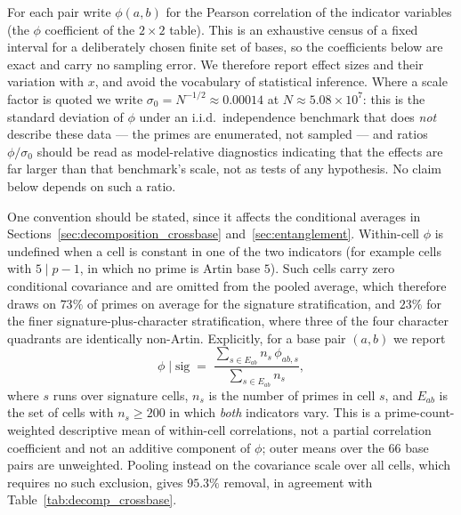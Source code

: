 \documentclass[11pt,reqno]{amsart}
\theoremstyle{plain}
\theoremstyle{definition}
\begin{document}
For each pair write $\phi(a,b)$ for the Pearson correlation of the indicator
variables (the $\phi$ coefficient of the $2\times2$ table). This is an exhaustive census of a fixed
interval for a deliberately chosen finite set of bases, so the coefficients
below are exact and carry no sampling error. We therefore report effect sizes
and their variation with $x$, and avoid the vocabulary of statistical
inference. Where a scale factor is quoted we write
$\sigma_0 = N^{-1/2} \approx 0.00014$ at $N \approx 5.08 \times 10^7$: this is
the standard deviation of $\phi$ under an i.i.d.\ independence benchmark that
does \emph{not} describe these data --- the primes are enumerated, not
sampled --- and ratios $\phi/\sigma_0$ should be read as model-relative
diagnostics indicating that the effects are far larger than that benchmark's
scale, not as tests of any hypothesis. No claim below depends on such a ratio.

One convention should be stated, since it affects the conditional averages in
Sections~\ref{sec:decomposition_crossbase} and~\ref{sec:entanglement}. Within-cell $\phi$
is undefined when a cell is constant in one of the two indicators (for example
cells with $5 \mid p-1$, in which no prime is Artin base $5$). Such cells carry
zero conditional covariance and are omitted from the pooled average, which
therefore draws on $73\%$ of primes on average for the signature
stratification, and $23\%$ for the finer signature-plus-character
stratification, where three of the four character quadrants are identically
non-Artin. Explicitly, for a base pair $(a,b)$ we report
\[
  \phi \mid \mathrm{sig} \;=\;
  \frac{\sum_{s \in E_{ab}} n_s\,\phi_{ab,s}}{\sum_{s \in E_{ab}} n_s},
\]
where $s$ runs over signature cells, $n_s$ is the number of primes in cell $s$,
and $E_{ab}$ is the set of cells with $n_s \ge 200$ in which \emph{both}
indicators vary. This is a prime-count-weighted descriptive mean of within-cell
correlations, not a partial correlation coefficient and not an additive
component of $\phi$; outer means over the $66$ base pairs are unweighted.
Pooling instead on the covariance scale over all cells, which
requires no such exclusion, gives $95.3\%$ removal, in agreement with
Table~\ref{tab:decomp_crossbase}.
\end{document}
